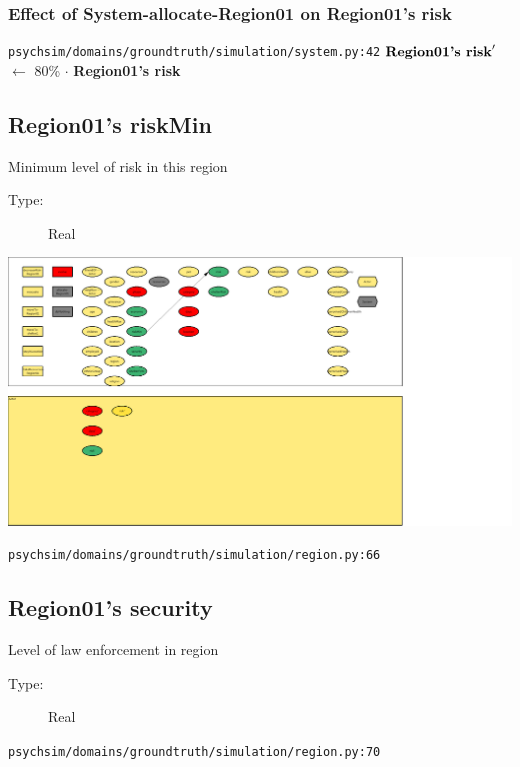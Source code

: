 \documentclass{article}%
\begin{document}
%
\subsubsection{Effect of System{-}allocate{-}Region01 on Region01's risk}%
\label{ssubsec:Effect of System{-}allocate{-}Region01 on Region01's risk}%
\begin{flushleft}%
\verb|psychsim/domains/groundtruth/simulation/system.py:42|%
\linebreak%
$\mbox{\textbf{Region01's risk}} '$%
$\leftarrow$%
80\%%
$\cdot$%
\textbf{Region01's risk}%
\end{flushleft}

%
\subsection{Region01's riskMin}%
\label{subsec:Region01's riskMin}%
Minimum level of risk in this region%
\begin{description}%
\item[Type:]%
Real%
\end{description}%
\includegraphics[width=\textwidth]{images/riskMinOfRegion01.png}%
\begin{flushleft}%
\verb|psychsim/domains/groundtruth/simulation/region.py:66|%
\end{flushleft}

%
\subsection{Region01's security}%
\label{subsec:Region01's security}%
Level of law enforcement in region%
\begin{description}%
\item[Type:]%
Real%
\end{description}%
\begin{flushleft}%
\verb|psychsim/domains/groundtruth/simulation/region.py:70|%
\end{flushleft}
\end{document}
